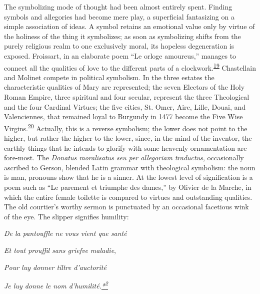 The symbolizing mode of thought had been almost entirely spent. Finding
symbols and allegories had become mere play, a superficial fantasizing
on a simple association of ideas. A symbol retains an emotional value
only by virtue of the holiness of the thing it symbolizes; as soon as
symbolizing shifts from the purely religious realm to one exclusively
moral, its hopeless degeneration is exposed. Froissart, in an elaborate
poem ``Le orloge amoureus,'' manages to connect all the qualities of
love to the different parts of a
clockwork.\textsuperscript{\protect\hypertarget{16_Chapter_Nine__THE_DECLINE_OF_SYM.xhtmlux5cux23id_756}{\protect\hyperlink{23_NOTES.xhtmlux5cux23page_426}{19}}}
Chastellain and Molinet compete in political symbolism. In the three
estates the characteristic qualities of Mary are represented; the seven
Electors of the Holy Roman Empire, three spiritual and four secular,
represent the three Theological and the four Cardinal Virtues; the five
cities, St. Omer, Aire, Lille, Douai, and Valenciennes, that remained
loyal to Burgundy in 1477 become the Five Wise
Virgins.\textsuperscript{\protect\hypertarget{16_Chapter_Nine__THE_DECLINE_OF_SYM.xhtmlux5cux23id_754}{\protect\hyperlink{23_NOTES.xhtmlux5cux23id_755}{20}}}
Actually, this is a reverse symbolism; the lower does not point to the
higher, but rather the higher to the lower, since, in the mind of the
inventor, the earthly things that he intends to glorify with some
heavenly ornamentation are fore-most. The \emph{Donatus moralisatus seu
per allegoriam traductus}, occasionally ascribed to Gerson, blended
Latin grammar with theological symbolism: the noun is man, pronouns show
that he is a sinner. At the lowest level of signification is a poem such
as ``Le parement et triumphe des dames,'' by Olivier de la Marche, in
which the entire female toilette is compared to virtues and outstanding
qualities. The old courtier's worthy sermon is punctuated by an
occasional facetious wink of the eye. The slipper signifies humility:

\emph{\protect\hypertarget{16_Chapter_Nine__THE_DECLINE_OF_SYM.xhtmlux5cux23page_243}{}{}De
la pantouffle ne vous vient que santé}

\emph{Et tout prouffil sans griefve maladie},

\emph{Pour luy donner tiltre d'auctorité}

\emph{Je luy donne le nom
d'humilité.\protect\hypertarget{16_Chapter_Nine__THE_DECLINE_OF_SYM.xhtmlux5cux23id_2575}{\protect\hyperlink{23_NOTES.xhtmlux5cux23id_2576}{*\textsuperscript{2}}}}


